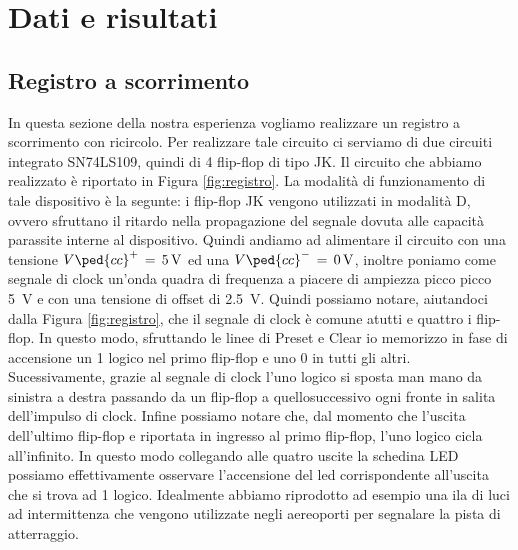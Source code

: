 \section*{Dati e risultati}

\subsection*{Registro a scorrimento}

In questa sezione della nostra esperienza vogliamo realizzare un registro a scorrimento con ricircolo. Per realizzare tale circuito ci serviamo di due circuiti integrato SN74LS109, quindi di 4 flip-flop di tipo JK. Il circuito che abbiamo realizzato è riportato in Figura \ref{fig:registro}.
La modalità di funzionamento di tale dispositivo è la segunte: i flip-flop JK vengono utilizzati in modalità D, ovvero sfruttano il ritardo nella propagazione del segnale dovuta alle capacità parassite interne al dispositivo.
Quindi andiamo ad alimentare il circuito con una tensione $V\ped{cc}^+\,=\,\SI{+5}{\volt}$ ed una $V\ped{cc}^-\,=\,\SI{0}{\volt}$, inoltre poniamo come segnale di clock un'onda quadra di frequenza a piacere di ampiezza picco picco \SI{5}{\volt} e con una tensione di offset di \SI{+2.5}{\volt}.
Quindi possiamo notare, aiutandoci dalla Figura \ref{fig:registro}, che il segnale di clock è comune atutti e quattro i flip-flop. In questo modo, sfruttando le linee di Preset e Clear io memorizzo in fase di accensione un 1 logico nel primo flip-flop e uno 0 in tutti gli altri. Sucessivamente, grazie al segnale di clock l'uno logico si sposta man mano da sinistra a destra passando da un flip-flop a quellosuccessivo ogni fronte in salita dell'impulso di clock. Infine possiamo notare che, dal momento che l'uscita dell'ultimo flip-flop e riportata in ingresso al primo flip-flop, l'uno logico cicla all'infinito. In questo modo collegando alle quatro uscite la schedina LED possiamo effettivamente osservare l'accensione del led corrispondente all'uscita che si trova ad 1 logico.
Idealmente abbiamo riprodotto ad esempio una ila di luci ad intermittenza che vengono utilizzate negli aereoporti per segnalare la pista di atterraggio.

